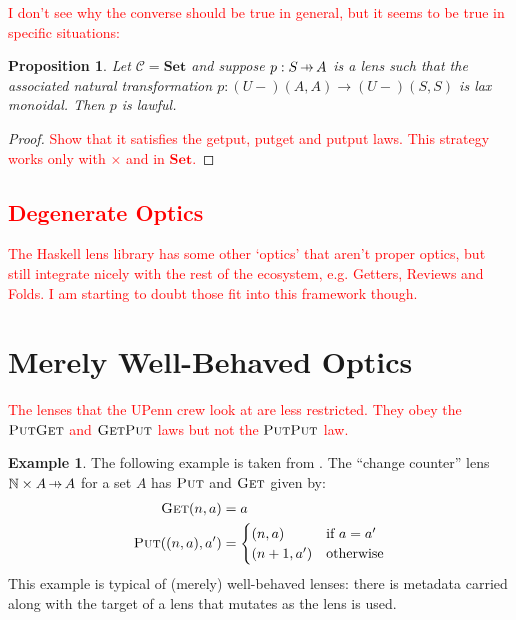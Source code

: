 \documentclass[11pt,a4paper]{article}
\theoremstyle{plain}
\newtheorem{proposition}[theorem]{Proposition}
\theoremstyle{definition}
\newtheorem{example}[theorem]{Example}
\newcommand{\C}{\mathscr{C}}
\newcommand{\bN}{\mathbb{N}}
\newcommand{\Set}{\mathbf{Set}}
\newcommand{\fget}{\textsc{Get}}
\newcommand{\fput}{\textsc{Put}}
\newcommand{\hto}{\ensuremath{\,\mathaccent\shortmid\rightarrow\,}}
\newcommand{\todo}[1]{\textcolor{red}{\small #1}}
\begin{document}
\todo{I don't see why the converse should be true in general, but it seems to be true in specific situations:}

\begin{proposition}
Let $\C = \Set$ and suppose $p : S \hto A$ is a lens such that the associated natural transformation $p : (U-)(A,A) \to (U-)(S,S)$ is lax monoidal. Then $p$ is lawful.
\end{proposition}
\begin{proof}
\todo{Show that it satisfies the getput, putget and putput laws. This strategy works only with $\times$ and in $\Set$.}
\end{proof}

\todo{
\section{Degenerate Optics}
The Haskell lens library has some other `optics' that aren't proper optics, but still integrate nicely with the rest of the ecosystem, e.g. Getters, Reviews and Folds. I am starting to doubt those fit into this framework though.}

\section{Merely Well-Behaved Optics}
\todo{
The lenses that the UPenn crew look at are less restricted. They obey the $\fput\fget$ and $\fget\fput$ laws but not the $\fput\fput$ law. 
}

\begin{example}
The following example is taken from \cite{AClearPictureOfLensLaws}. The ``change counter'' lens $\bN \times A \hto A$ for a set $A$ has $\fput$ and $\fget$ given by:
\begin{align*}
\fget(n, a) &= a \\
\fput((n, a), a') &= \begin{cases}
(n, a) & \text{if } a = a' \\
(n+1, a') & \text{otherwise}
\end{cases}
\end{align*}
This example is typical of (merely) well-behaved lenses: there is metadata carried along with the target of a lens that mutates as the lens is used.
\end{example}
\end{document}
